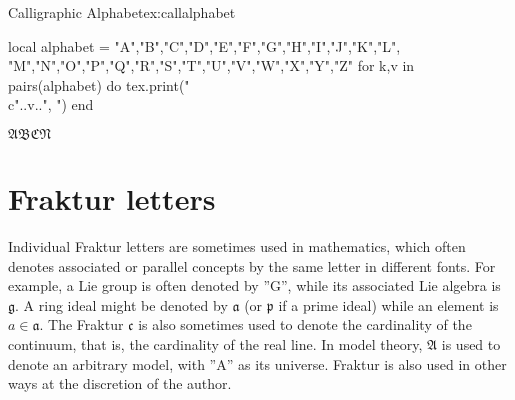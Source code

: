{{{\begin{texexample}{Calligraphic Alphabet}{ex:callalphabet}
\providecommand*{\cA}{\ensuremath{\mathcal{A}}}
\providecommand*{\cB}{\ensuremath{\mathcal{B}}}
\providecommand*{\cC}{\ensuremath{\mathcal{C}}}
\providecommand*{\cD}{\ensuremath{\mathcal{D}}}
\providecommand*{\cE}{\ensuremath{\mathcal{E}}}
\providecommand*{\cF}{\ensuremath{\mathcal{F}}}
\providecommand*{\cG}{\ensuremath{\mathcal{G}}}
\providecommand*{\cH}{\ensuremath{\mathcal{H}}}
\providecommand*{\cI}{\ensuremath{\mathcal{I}}}
\providecommand*{\cJ}{\ensuremath{\mathcal{J}}}
\providecommand*{\cK}{\ensuremath{\mathcal{K}}}
\providecommand*{\cL}{\ensuremath{\mathcal{L}}}
\providecommand*{\cM}{\ensuremath{\mathcal{M}}}
\providecommand*{\cN}{\ensuremath{\mathcal{N}}}
\providecommand*{\cO}{\ensuremath{\mathcal{O}}}
\providecommand*{\cP}{\ensuremath{\mathcal{P}}}
\providecommand*{\cQ}{\ensuremath{\mathcal{Q}}}
\providecommand*{\cR}{\ensuremath{\mathcal{R}}}
\providecommand*{\cS}{\ensuremath{\mathcal{S}}}
\providecommand*{\cT}{\ensuremath{\mathcal{T}}}
\providecommand*{\cU}{\ensuremath{\mathcal{U}}}
\providecommand*{\cV}{\ensuremath{\mathcal{V}}}
\providecommand*{\cW}{\ensuremath{\mathcal{W}}}
\providecommand*{\cX}{\ensuremath{\mathcal{X}}}
\providecommand*{\cY}{\ensuremath{\mathcal{Y}}}
\providecommand*{\cZ}{\ensuremath{\mathcal{Z}}}
\begin{luacode}
local alphabet = {"A","B","C","D","E","F","G","H","I","J","K","L",
                  "M","N","O","P","Q","R","S","T","U","V","W","X","Y","Z"}
for k,v in pairs(alphabet) do
	tex.print("\\c"..v..", ")
end
\end{luacode}
$\mathfrak{A B C N}$
\end{texexample}

\section*{Fraktur letters}

Individual Fraktur letters are sometimes used in mathematics, which often denotes associated or parallel concepts by the same letter in different fonts. For example, a Lie group is often denoted by ''G'', while its associated Lie algebra is $\mathfrak{g}$. 
A ring ideal might be denoted by $\mathfrak{a}$ (or $\mathfrak{p}$ if a prime ideal) while an element is $a \in \mathfrak{a}$. The Fraktur $\mathfrak c$ is also sometimes used to denote the cardinality of the continuum, that is, the cardinality of the real line. In model theory, $\mathfrak{A}$ is used to denote an arbitrary model, with ''A'' as its universe. Fraktur is also used in other ways at the discretion of the author.


}}}

